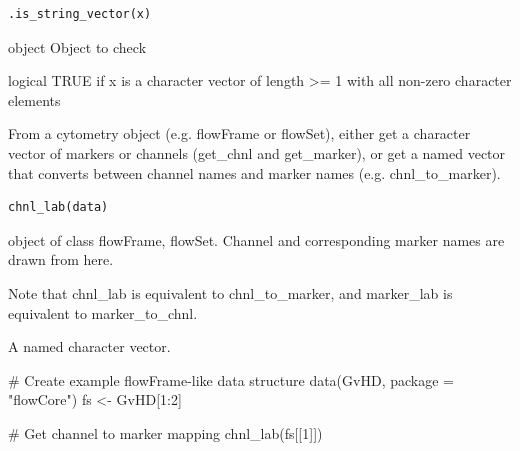 \documentclass[letterpaper]{book}
\begin{document}
%
\begin{Usage}
\begin{verbatim}
.is_string_vector(x)
\end{verbatim}
\end{Usage}
%
\begin{Arguments}
\begin{ldescription}
\item[\code{x}] object Object to check
\end{ldescription}
\end{Arguments}
%
\begin{Value}
logical TRUE if x is a character vector of length >= 1 with all non-zero character elements
\end{Value}
%
\begin{Description}
From a cytometry object (e.g. flowFrame or flowSet),
either get a character vector of markers
or channels (get\_chnl and get\_marker),
or get a named vector that converts
between channel names and marker names (e.g. chnl\_to\_marker).
\end{Description}
%
\begin{Usage}
\begin{verbatim}
chnl_lab(data)
\end{verbatim}
\end{Usage}
%
\begin{Arguments}
\begin{ldescription}
\item[\code{data}] object of class flowFrame, flowSet. Channel and corresponding
marker names are drawn from here.
\end{ldescription}
\end{Arguments}
%
\begin{Details}
Note that chnl\_lab is equivalent to chnl\_to\_marker,
and marker\_lab is equivalent to marker\_to\_chnl.
\end{Details}
%
\begin{Value}
A named character vector.
\end{Value}
%
\begin{Examples}
\begin{ExampleCode}

# Create example flowFrame-like data structure
data(GvHD, package = "flowCore") 
fs <- GvHD[1:2]

# Get channel to marker mapping
chnl_lab(fs[[1]])


\end{ExampleCode}
\end{Examples}
\end{document}
